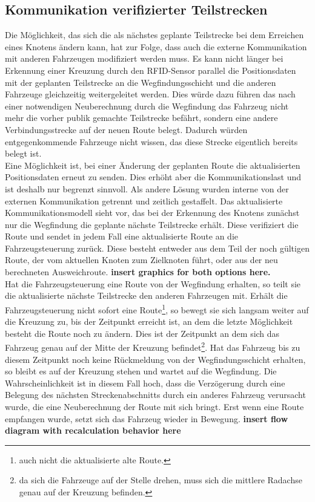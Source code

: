 	\subsection{Kommunikation verifizierter Teilstrecken}
		\label{Anpassung Kommunikation}
		Die Möglichkeit, das sich die als nächstes geplante Teilstrecke bei dem Erreichen eines Knotens ändern kann, hat zur Folge, dass auch die externe Kommunikation mit anderen Fahrzeugen modifiziert werden muss. Es kann nicht länger bei Erkennung einer Kreuzung durch den \ac{RFID}-Sensor parallel die Positionsdaten mit der geplanten Teilstrecke an die Wegfindungsschicht und die anderen Fahrzeuge gleichzeitig weitergeleitet werden. Dies würde dazu führen das nach einer notwendigen Neuberechnung durch die Wegfindung das Fahrzeug nicht mehr die vorher publik gemachte Teilstrecke befährt, sondern eine andere Verbindungsstrecke auf der neuen Route belegt. Dadurch würden entgegenkommende Fahrzeuge nicht wissen, das diese Strecke eigentlich bereits belegt ist.
		\\
		Eine Möglichkeit ist, bei einer Änderung der geplanten Route die aktualisierten Positionsdaten erneut zu senden. Dies erhöht aber die Kommunikationslast und ist deshalb nur begrenzt sinnvoll. Als andere  Lösung wurden interne von der externen Kommunikation getrennt und zeitlich gestaffelt. Das aktualisierte Kommunikationsmodell sieht vor, das bei der Erkennung des Knotens zunächst nur die Wegfindung die geplante nächste Teilstrecke erhält. Diese verifiziert die Route und sendet in jedem Fall eine aktualisierte Route an die Fahrzeugsteuerung zurück. Diese besteht entweder aus dem Teil der noch gültigen Route, der vom aktuellen Knoten zum Zielknoten führt, oder aus der neu berechneten Ausweichroute. \textbf{insert graphics for both options here.}
		\\
		Hat die Fahrzeugsteuerung eine Route von der Wegfindung erhalten, so teilt sie die aktualisierte nächste Teilstrecke den anderen Fahrzeugen mit. Erhält die Fahrzeugsteuerung nicht sofort eine Route\footnote{auch nicht die aktualisierte alte Route.}, so bewegt sie sich langsam weiter auf die Kreuzung zu, bis der Zeitpunkt erreicht ist, an dem die letzte Möglichkeit besteht die Route noch zu ändern. Dies ist der Zeitpunkt an dem sich das Fahrzeug genau auf der Mitte der Kreuzung befindet\footnote{da sich die Fahrzeuge auf der Stelle drehen, muss sich die mittlere Radachse genau auf der Kreuzung befinden.}. Hat das Fahrzeug bis zu diesem Zeitpunkt noch keine Rückmeldung von der Wegfindungsschicht erhalten, so bleibt es auf der Kreuzung stehen und wartet auf die Wegfindung. Die Wahrscheinlichkeit ist in diesem Fall hoch, dass die Verzögerung durch eine Belegung des nächsten Streckenabschnitts durch ein anderes Fahrzeug verursacht wurde, die eine Neuberechnung der Route mit sich bringt. Erst wenn eine Route empfangen wurde, setzt sich das Fahrzeug wieder in Bewegung. \textbf{insert flow diagram with recalculation behavior here}
